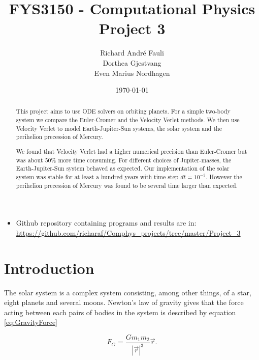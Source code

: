 \documentclass[norsk,a4paper,12pt]{article}
\title{FYS3150 - Computational Physics\\\vspace{2mm} \Large{Project 3}}
\author{\large Richard Andr\'e Fauli\\ Dorthea Gjestvang\\ Even Marius Nordhagen}
\date{\today}
\begin{document}
\maketitle
\begin{abstract}
This project aims to use ODE solvers on orbiting planets. For a simple two-body system we compare the Euler-Cromer and the Velocity Verlet methods. We then use Velocity Verlet to model Earth-Jupiter-Sun systems, the solar system and the perihelion precession of Mercury.

We found that Velocity Verlet had a higher numerical precision than Euler-Cromer but was about $50\%$ more time consuming. For different choices of Jupiter-masses, the Earth-Jupiter-Sun system behaved as expected. Our implementation of the solar system was stable for at least a hundred years with time step $dt=10^{-3}$. However the perihelion precession of Mercury was found to be several time larger than expected.\end{abstract}
\begin{itemize}
\item Github repository containing programs and results are in: \url{https://github.com/richaraf/Comphys_projects/tree/master/Project_3}
\end{itemize}
\section{Introduction}
The solar system is a complex system consisting, among other things, of a star, eight planets and several moons. Newton's law of gravity gives that the force acting between each pairs of bodies in the system is described by equation \ref{eq:GravityForce}

\begin{equation}
    F_G = \frac{G m_1 m_2}{|\vec{r}|^3}\vec{r}.
    \label{eq:GravityForce}
\end{equation}
\end{document}
